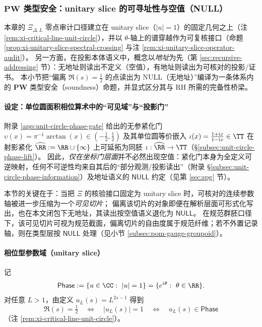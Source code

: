 \subsubsection{\texorpdfstring{$\mathbf{PW}$}{PW} 类型安全：unitary slice 的可寻址性与空值（NULL）}\label{subsec:xi-pw-type-safety-null}
本章的 \(\Xi_{\Delta,L}\) 零点审计口径建立在 unitary slice（\(|u|=1\)）的固定几何之上（注 \ref{rem:xi-critical-line-unit-circle}），并以 \(\theta\)-轴上的谱穿越作为可复核接口（命题 \ref{prop:xi-unitary-slice-spectral-crossing} 与注 \ref{rem:xi-unitary-slice-operator-audit}）。
另一方面，在投影本体语义中，概念以\emph{地址}为先（第 \ref{sec:recursive-addressing} 节）：无地址则读出不定义（空值），有地址则读出为可核对的投影/证书。
本小节把“偏离 \(\Re(s)=\tfrac12\) 的点读出为 NULL（无地址）”编译为一条体系内的 \(\mathbf{PW}\) 类型安全（soundness）命题，并显式区分其与 RH 所需的完备性桥梁。

\paragraph{设定：单位圆面积相位算术中的“可见域”与“投影门”}
附录 \ref{app:unit-circle-phase-gate} 给出的无参紧化门
\(\upsilon(x)=\pi^{-1}\arctan(x)\in(-\tfrac12,\tfrac12)\)
及其单位圆等价嵌入
\(\iota(x)=\frac{1+\mathrm{i}x}{1-\mathrm{i}x}\in\TT\)
在射影紧化 \(\widehat{\RR}:=\RR\cup\{\infty\}\) 上可延拓为同胚 \(\iota:\widehat{\RR}\to\TT\)（\S\ref{subsec:unit-circle-phase-lift}）。
因此，\emph{仅在坐标门层面}并不必然出现空值：紧化门本身为全定义可逆映射，任何不可逆性均来自其后的“部分观测/投影读出”（附录 \S\ref{subsec:unit-circle-phase-information}）及地址语义的 \(\mathsf{NULL}\) 约定（见第 \ref{sec:spg} 节）。
\par
本节的关键在于：当把 \(\Xi\) 的核验接口固定为 unitary slice 时，可核对的连续参数轴被进一步压缩为一个\emph{可见切片}；
偏离该切片的对象即便在解析层面可形式化写出，也在本文闭包下无地址，其读出按空值语义退化为 \(\mathsf{NULL}\)。
在规范群胚口径下，该可见切片可视为规范截面，偏离切片的自由度属于规范纤维；若不外置记录轴，则在类型层按 \(\mathsf{NULL}\) 处理（见小节 \ref{subsec:pom-gauge-groupoid}）。

\paragraph{相位型参数域（unitary slice）}
记
\[
\mathsf{Phase}:=\{u\in\CC:\ |u|=1\}=\{e^{i\theta}:\ \theta\in\RR\}.
\]
对任意 \(L>1\)，由定义 \(u_L(s)=L^{2s-1}\) 得到
\[
\Re(s)=\tfrac12\quad\Longleftrightarrow\quad |u_L(s)|=1\quad\Longleftrightarrow\quad u_L(s)\in \mathsf{Phase}
\]
（注 \ref{rem:xi-critical-line-unit-circle}）。


